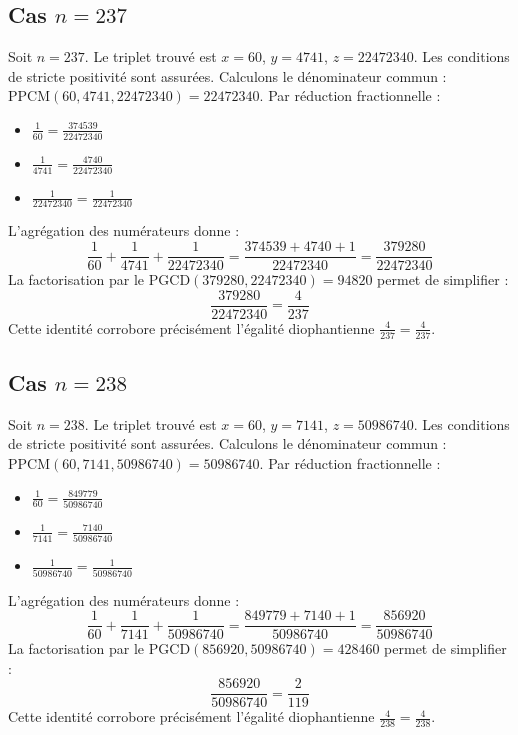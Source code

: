 \documentclass[11pt,a4paper]{article}
\begin{document}
\subsection{Cas $n = 237$}
Soit $n = 237$. Le triplet trouvé est $x = 60$, $y = 4741$, $z = 22472340$.
Les conditions de stricte positivité sont assurées.
Calculons le dénominateur commun : $\text{PPCM}(60, 4741, 22472340) = 22472340$.
Par réduction fractionnelle :
\begin{itemize}
    \item $\frac{1}{60} = \frac{374539}{22472340}$
    \item $\frac{1}{4741} = \frac{4740}{22472340}$
    \item $\frac{1}{22472340} = \frac{1}{22472340}$
\end{itemize}
L'agrégation des numérateurs donne :
$$ \frac{1}{60} + \frac{1}{4741} + \frac{1}{22472340} = \frac{374539 + 4740 + 1}{22472340} = \frac{379280}{22472340} $$
La factorisation par le $\text{PGCD}(379280, 22472340) = 94820$ permet de simplifier :
$$ \frac{379280}{22472340} = \frac{4}{237} $$
Cette identité corrobore précisément l'égalité diophantienne $\frac{4}{237} = \frac{4}{237}$.

\subsection{Cas $n = 238$}
Soit $n = 238$. Le triplet trouvé est $x = 60$, $y = 7141$, $z = 50986740$.
Les conditions de stricte positivité sont assurées.
Calculons le dénominateur commun : $\text{PPCM}(60, 7141, 50986740) = 50986740$.
Par réduction fractionnelle :
\begin{itemize}
    \item $\frac{1}{60} = \frac{849779}{50986740}$
    \item $\frac{1}{7141} = \frac{7140}{50986740}$
    \item $\frac{1}{50986740} = \frac{1}{50986740}$
\end{itemize}
L'agrégation des numérateurs donne :
$$ \frac{1}{60} + \frac{1}{7141} + \frac{1}{50986740} = \frac{849779 + 7140 + 1}{50986740} = \frac{856920}{50986740} $$
La factorisation par le $\text{PGCD}(856920, 50986740) = 428460$ permet de simplifier :
$$ \frac{856920}{50986740} = \frac{2}{119} $$
Cette identité corrobore précisément l'égalité diophantienne $\frac{4}{238} = \frac{4}{238}$.
\end{document}
